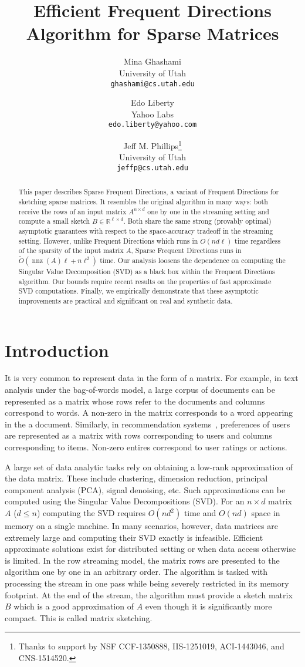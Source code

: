 \documentclass[11pt]{article}
\title{Efficient Frequent Directions Algorithm for Sparse Matrices}
\author{
Mina Ghashami\\ University of Utah \\ \texttt{ghashami@cs.utah.edu}
\and
Edo Liberty\\ Yahoo Labs\\ \texttt{edo.liberty@yahoo.com}
\and
Jeff M. Phillips\thanks{Thanks to support by NSF CCF-1350888, IIS-1251019, ACI-1443046, and CNS-1514520.}\\ University of Utah \\ \texttt{jeffp@cs.utah.edu}
}
\date\nonumber
\newcommand{\R}{\mathbb{R}}
\newcommand{\nnz}{\operatorname{nnz}}
\begin{document}
\maketitle
\begin{abstract}
This paper describes Sparse Frequent Directions, a variant of Frequent Directions for sketching sparse matrices. 
It resembles the original algorithm in many ways:
both receive the rows of an input matrix $A^{n \times d}$ one by one in the streaming setting and compute a small sketch $B \in \R^{\ell \times d}$.
Both share the same strong (provably optimal) asymptotic guarantees with respect to the space-accuracy tradeoff in the streaming setting. However, unlike Frequent Directions which runs in $O(nd\ell)$ time regardless of the sparsity of the input matrix $A$, Sparse Frequent Directions runs in $\tilde{O}\left(\nnz(A)\ell + n\ell^2\right)$ time.
Our analysis loosens the dependence on computing the Singular Value Decomposition (SVD) as a black box within the Frequent Directions algorithm. Our bounds require recent results on the properties of fast approximate SVD computations.  
Finally, we empirically demonstrate that these asymptotic improvements are practical and significant on real and synthetic data.  
\end{abstract}

\section{Introduction}
\label{sec:intro}
It is very common to represent data in the form of a matrix. 
For example, in text analysis under the bag-of-words model, a large corpus of documents can be represented as a matrix whose rows refer to the documents and columns correspond to words. A non-zero in the matrix corresponds to a word appearing in the a document. 
Similarly, in recommendation systems~\cite{drineas2002competitive}, preferences of users are represented as a matrix with rows corresponding to users and columns corresponding to items. Non-zero entires correspond to user ratings or actions.

A large set of data analytic tasks rely on obtaining a low-rank approximation of the data matrix. 
These include clustering, dimension reduction, principal component analysis (PCA), signal denoising, etc. 
Such approximations can be computed using the Singular Value Decompositions (SVD).  
For an $n \times d$ matrix $A$ ($d\le n$) computing the SVD requires $O(n d^2)$ time and $O(nd)$ space in memory on a single machine. 
In many scenarios, however, data matrices are extremely large and computing their SVD exactly is infeasible. 
Efficient approximate solutions exist for distributed setting or when data access otherwise is limited.
In the row streaming model, the matrix rows are presented to the algorithm one by one in an arbitrary order.
The algorithm is tasked with processing the stream in one pass while being severely restricted in its memory footprint. 
At the end of the stream, the algorithm must provide a sketch matrix $B$ which is a good approximation of $A$ even though it is significantly more compact. This is called matrix sketching.
\end{document}
